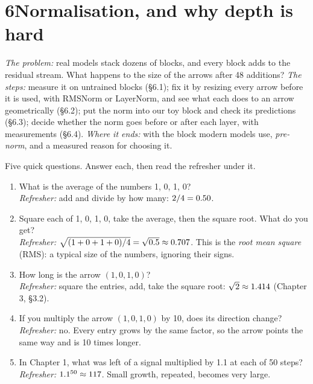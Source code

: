 \newpage
\section*{6\quad Normalisation, and why depth is hard}

\begin{chaptermap}
\emph{The problem:} real models stack dozens of blocks, and every block adds to the residual stream. What
happens to the size of the arrows after 48 additions? \emph{The steps:} measure it on untrained blocks (\S6.1);
fix it by resizing every arrow before it is used, with RMSNorm or LayerNorm, and see what each does to an arrow
geometrically (\S6.2); put the norm into our toy block and check its predictions (\S6.3); decide whether the
norm goes before or after each layer, with measurements (\S6.4). \emph{Where it ends:} with the block modern
models use, \emph{pre-norm}, and a measured reason for choosing it.
\end{chaptermap}


\begin{beforeyoustart}
Five quick questions. Answer each, then read the refresher under it.
\begin{enumerate}[label=\arabic*.,leftmargin=1.6em]
\item What is the average of the numbers 1, 0, 1, 0?\\
\emph{Refresher:} add and divide by how many: $2/4 = 0.50$.
\item Square each of 1, 0, 1, 0, take the average, then the square root. What do you get?\\
\emph{Refresher:} $\sqrt{(1+0+1+0)/4}=\sqrt{0.5}\approx0.707$. This is the \emph{root mean square}
(RMS): a typical size of the numbers, ignoring their signs.
\item How long is the arrow $(1,0,1,0)$?\\
\emph{Refresher:} square the entries, add, take the square root: $\sqrt2\approx1.414$ (Chapter 3,
\S3.2).
\item If you multiply the arrow $(1,0,1,0)$ by 10, does its direction change?\\
\emph{Refresher:} no. Every entry grows by the same factor, so the arrow points the same way and is 10 times
longer.
\item In Chapter 1, what was left of a signal multiplied by 1.1 at each of 50 steps?\\
\emph{Refresher:} $1.1^{50}\approx117$. Small growth, repeated, becomes very large.
\end{enumerate}
\end{beforeyoustart}

